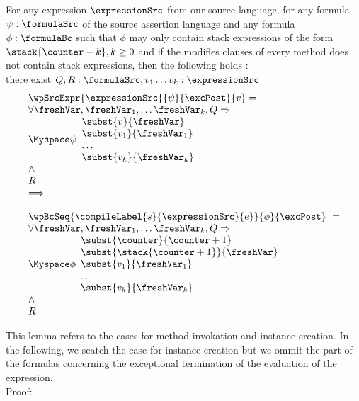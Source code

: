 \begin{exprSrcBcWp2} \label{pogEq:aux:exprSrcBcWp}
 For any expression $\expressionSrc$ from our source language, for any formula $\psi: \formulaSrc$  
of the source assertion language and any formula $\phi: \formulaBc$ such that $\phi$ may only 
contain stack expressions of the form     $\stack{\counter - k}, k \ge 0$ and if the modifies clauses of every
 method does not contain stack expressions, then the following holds : \\
there exist $ Q,R:\formulaSrc, v_1 \ldots v_k :\expressionSrc $
$$ \begin{array}{l} \wpSrcExpr{\expressionSrc }{ \psi }{ \excPost}{v} = \\
 \forall    \freshVar, \freshVar_1, \ldots  \freshVar_k   ,  Q \Rightarrow \\
 \Myspace \psi 
                                                                             \begin{array}{l}
									         \subst{v }{ \freshVar }  \\
									        \subst{v_1 }{ \freshVar_1 }  \\
										\ldots \\
										\subst{v_k}{ \freshVar_k } 
									     \end{array}\\
          \wedge \\ 
	  R  

      
  \\
 \Longrightarrow \\
 \\

  
	    \wpBcSeq{ \compileLabel{s}{\expressionSrc}{e} }{ \phi }{\excPost} \  = \\ 
            \forall \freshVar, \freshVar_1, \ldots  \freshVar_k ,   Q \Rightarrow \\
	                      \Myspace \phi \begin{array}{l}
                                       \subst{\counter}{\counter + 1}\\
			               \subst{\stack{\counter +1}}{ \freshVar }\\
				       \subst{v_1 }{ \freshVar_1 }  \\
				       \ldots \\
				       \subst{v_k}{ \freshVar_k } 
                         \end{array} \\ 
          \wedge \\ 
	  R 
  \end{array}$$
\end{exprSrcBcWp2}
This lemma refers to the cases for method invokation and instance creation. In the following, we scatch the case for 
instance creation but we ommit the part of the formulas concerning the exceptional termination of the evaluation of
 the expression. \\
Proof:

